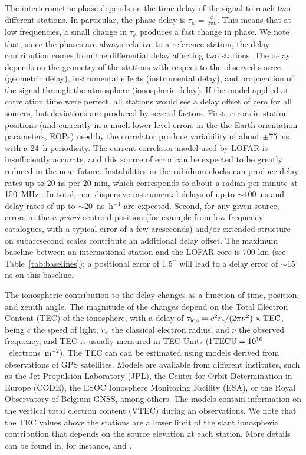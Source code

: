 \documentclass[graybox]{svmult}
\begin{document}
The interferometric phase depends on the time delay of the signal to reach two
different stations. In particular, the phase delay is
$\tau_{\phi}=\frac{\phi}{2\pi\nu}$. This means that at low frequencies, a small
change in $\tau_{\phi}$ produces a fast change in phase. We note that, since the
phases are always relative to a reference station, the delay contribution comes
from the differential delay affecting two stations. The delay depends on the
geometry of the stations with respect to the observed source (geometric delay),
instrumental effects (instrumental delay), and propagation of the signal through
the atmosphere (ionospheric delay). If the model applied at correlation time
were perfect, all stations would see a delay offset of zero for all sources, but
deviations are produced by several factors. First, errors in station positions
(and currently in a much lower level errors in the the Earth orientation
parameters, EOPs) used by the correlator produce variability of about $\pm75$~ns
with a 24~h periodicity.  The current correlator model used by LOFAR is
insufficiently accurate, and this source of error can be expected to be greatly
reduced in the near future.  Instabilities in the rubidium clocks can produce
delay rates up to 20 ns per 20 min, which corresponds to about a radian per
minute at 150~MHz \citep{vanhaarlem13}.  In total, non-dispersive instrumental
delays of up to $\sim100$~ns and delay rates of up to $\sim$20~ns~h$^{-1}$ are
expected.  Second, for any given source, errors in the {\em a priori} centroid
position (for example from low-frequency catalogues, with a typical error of a
few arcseconds) and/or extended structure on subarcsecond scales contribute an
additional delay offset.  The maximum baseline between an international station
and the LOFAR core is 700 km (see Table~\ref{tab:baselines}); a positional error
of 1.5$^{\prime\prime}$ will lead to a delay error of $\sim$15 ns on this
baseline.

The ionospheric contribution to the delay changes as a function of time,
position, and zenith angle.  The magnitude of the changes depend on the Total
Electron Content (TEC) of the ionosphere, with a delay of $\tau_{\rm
ion}=c^{2}r_{\rm e}/(2\pi\nu^{2})\times {\rm TEC}$, being $c$ the speed of
light, $r_{\rm e}$ the classical electron radius, and $\nu$ the observed
frequency, and TEC is usually measured in TEC Units (1${\rm
TECU}=10^{16}$~electrons~m$^{-2}$).  The TEC can can be estimated using models
derived from observations of GPS satellites.  Models are available from
different institutes, such as the Jet Propulsion Laboratory (JPL), the Center
for Orbit Determination in Europe (CODE), the ESOC Ionosphere Monitoring
Facility (ESA), or the Royal Observatory of Belgium GNSS, among others. The
models contain information on the vertical total electron content (VTEC) during
an observations. We note that the TEC values above the stations are a lower
limit of the slant ionospheric contribution that depends on the source elevation
at each station. More details can be found in, for instance, \cite{nigl07} and
\cite{sotomayor13a}.
\end{document}
